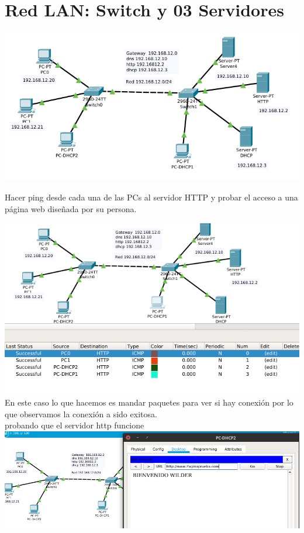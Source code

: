 \section{Red LAN: Switch y 03 Servidores}
\includegraphics[scale=0.45]{img/switch3ser.png} 
\begin{definicion}[]
{
Hacer ping desde cada una de las PCs al servidor HTTP y
probar el acceso a una p\'agina web dise\~nada por su persona.
}
\end{definicion} 
\includegraphics[scale=0.5]{img/pinghttp.png} \\
En este caso lo que hacemos es mandar paquetes para ver si hay conexi\'on por lo que observamos la conexi\'on a sido exitosa.
\\probando que el servidor http funcione\\
\includegraphics[scale=0.5]{img/prueba.png} \\
